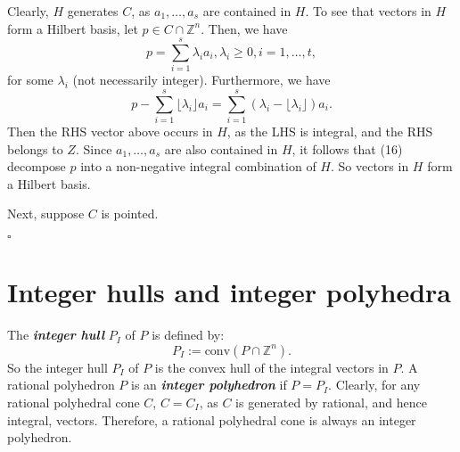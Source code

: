\documentclass{article}
\newenvironment{proof}{{\it Proof.}}{ \hfill $\square$}
\def\Z{{\mathbb Z}}
\begin{document}
\begin{proof}
Clearly, $H$ generates $C$, as $a_1,\dots,a_s$ are contained in $H$. To see that vectors in $H$ form a Hilbert basis, let $p\in C\cap\Z^n$. Then, we have
$$
p=\sum_{i=1}^s \lambda_i a_i, \lambda_i\geqslant 0,i=1,\dots,t,
$$
for some $\lambda_i$ (not necessarily integer). Furthermore, we have
$$
p-\sum_{i=1}^s \lfloor\lambda_i\rfloor a_i=\sum_{i=1}^s(\lambda_i-\lfloor\lambda_i\rfloor)a_i.
$$
Then the RHS vector above occurs in $H$, as the LHS is integral, and the RHS belongs to $Z$. Since $a_1,\dots,a_s$ are also contained in $H$, it follows that (16) decompose $p$ into a non-negative integral combination of $H$. So vectors in $H$ form a Hilbert basis.

Next, suppose $C$ is pointed.

\end{proof}




\section{Integer hulls and integer polyhedra}
The \emph{\textbf{integer hull}} $P_I$ of $P$ is defined by:
\begin{equation}
P_I:=\mbox{conv}(P\cap \Z^n).
\end{equation}
So the integer hull $P_I$ of $P$ is the convex hull of the integral vectors in $P$. A rational polyhedron $P$ is an \emph{\textbf{integer polyhedron}} if $P=P_I$. Clearly, for any rational polyhedral cone $C$, $C=C_I$, as $C$ is generated by rational, and hence integral, vectors. Therefore, a rational polyhedral cone is always an integer polyhedron.
\end{document}
